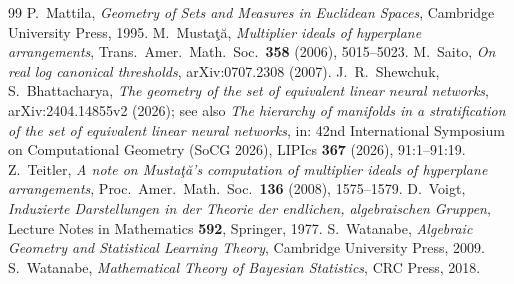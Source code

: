 \documentclass[11pt,a4paper]{article}
\theoremstyle{definition}
\theoremstyle{remark}
\numberwithin{equation}{section}
\begin{document}
\begin{thebibliography}{99}
 P.~Mattila, \emph{Geometry of Sets and Measures in Euclidean Spaces}, Cambridge University Press, 1995.
 M.~Mustaţă, \emph{Multiplier ideals of hyperplane arrangements}, Trans.\ Amer.\ Math.\ Soc.\ \textbf{358} (2006), 5015--5023.
 M.~Saito, \emph{On real log canonical thresholds}, arXiv:0707.2308 (2007).
 J.~R.~Shewchuk, S.~Bhattacharya, \emph{The geometry of the set of equivalent linear neural networks}, arXiv:2404.14855v2 (2026); see also \emph{The hierarchy of manifolds in a stratification of the set of equivalent linear neural networks}, in: 42nd International Symposium on Computational Geometry (SoCG 2026), LIPIcs \textbf{367} (2026), 91:1--91:19.
 Z.~Teitler, \emph{A note on Mustaţă's computation of multiplier ideals of hyperplane arrangements}, Proc.\ Amer.\ Math.\ Soc.\ \textbf{136} (2008), 1575--1579.
 D.~Voigt, \emph{Induzierte Darstellungen in der Theorie der endlichen, algebraischen Gruppen}, Lecture Notes in Mathematics \textbf{592}, Springer, 1977.
 S.~Watanabe, \emph{Algebraic Geometry and Statistical Learning Theory}, Cambridge University Press, 2009.
 S.~Watanabe, \emph{Mathematical Theory of Bayesian Statistics}, CRC Press, 2018.
\end{thebibliography}
\end{document}
